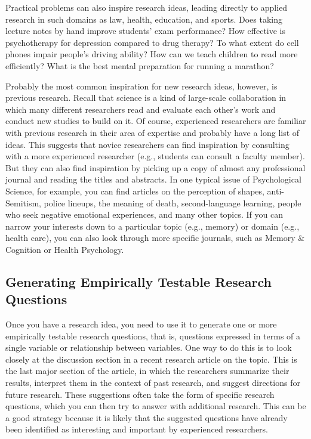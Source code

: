 
Practical problems can also inspire research ideas, leading directly to applied research in such domains as law, health, education, and sports. Does taking lecture notes by hand improve students' exam performance? How effective is psychotherapy for depression compared to drug therapy? To what extent do cell phones impair people's driving ability? How can we teach children to read more efficiently? What is the best mental preparation for running a marathon?

Probably the most common inspiration for new research ideas, however, is previous research. Recall that science is a kind of large-scale collaboration in which many different researchers read and evaluate each other's work and conduct new studies to build on it. Of course, experienced researchers are familiar with previous research in their area of expertise and probably have a long list of ideas. This suggests that novice researchers can find inspiration by consulting with a more experienced researcher (e.g., students can consult a faculty member). But they can also find inspiration by picking up a copy of almost any professional journal and reading the titles and abstracts. In one typical issue of Psychological Science, for example, you can find articles on the perception of shapes, anti-Semitism, police lineups, the meaning of death, second-language learning, people who seek negative emotional experiences, and many other topics. If you can narrow your interests down to a particular topic (e.g., memory) or domain (e.g., health care), you can also look through more specific journals, such as Memory \& Cognition or Health Psychology.

\subsection{Generating Empirically Testable Research Questions}

Once you have a research idea, you need to use it to generate one or more empirically testable research questions, that is, questions expressed in terms of a single variable or relationship between variables. One way to do this is to look closely at the discussion section in a recent research article on the topic. This is the last major section of the article, in which the researchers summarize their results, interpret them in the context of past research, and suggest directions for future research. These suggestions often take the form of specific research questions, which you can then try to answer with additional research. This can be a good strategy because it is likely that the suggested questions have already been identified as interesting and important by experienced researchers.

